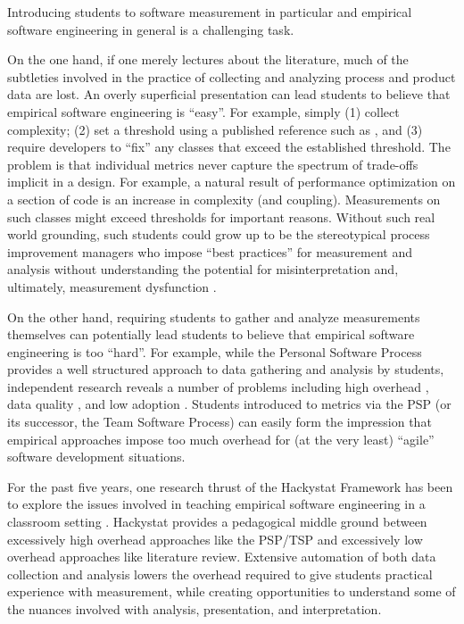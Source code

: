 \documentclass[10pt,twocolumn]{article}
\begin{document}


Introducing students to software measurement in particular and empirical
software engineering in general is a challenging task.  

On the one hand, if one merely lectures about the literature, much of the
subtleties involved in the practice of collecting and analyzing process and
product data are lost.  An overly superficial presentation can lead
students to believe that empirical software engineering is ``easy''. For example,
simply (1) collect complexity; (2) set a threshold using a published
reference such as \cite{Clark08}, and (3) require developers to ``fix'' any
classes that exceed the established threshold.  The problem is that
individual metrics never capture the spectrum of trade-offs implicit in a
design. For example, a natural result of performance optimization on a
section of code is an increase in complexity (and coupling). Measurements
on such classes might exceed thresholds for important reasons.  Without
such real world grounding, such students could grow up to be the
stereotypical process improvement managers who impose ``best practices''
for measurement and analysis without understanding the potential for
misinterpretation and, ultimately, measurement dysfunction \cite{Austin96}.

On the other hand, requiring students to gather and analyze measurements
themselves can potentially lead students to believe that empirical software
engineering is too ``hard''.  For example, while the Personal Software
Process \cite{Humphrey95} provides a well structured approach to data
gathering and analysis by students, independent research reveals a number
of problems including high overhead \cite{csdl2-01-12}, data quality
\cite{csdl-98-13}, and low adoption \cite{Borstler02}.  Students introduced
to metrics via the PSP (or its successor, the Team Software Process) can
easily form the impression that empirical approaches impose too much
overhead for (at the very least) ``agile'' software development situations.

For the past five years, one research thrust of the Hackystat Framework has
been to explore the issues involved in teaching empirical software
engineering in a classroom setting \cite{csdl2-03-12,csdl2-07-02}.
Hackystat provides a pedagogical middle ground between excessively high
overhead approaches like the PSP/TSP and excessively low overhead
approaches like literature review.  Extensive automation of both data
collection and analysis lowers the overhead required to give students
practical experience with measurement, while creating opportunities to
understand some of the nuances involved with analysis, presentation, and
interpretation.
\end{document}

